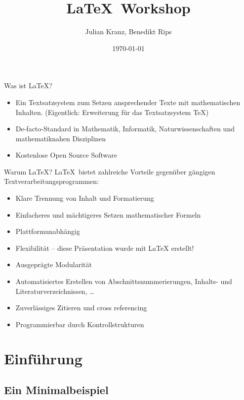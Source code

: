 \documentclass[german]{f1rstlady/templates/presentation}
\title{\LaTeX~Workshop}
\author{Julian Kranz, Benedikt Rips}
\institute[]{Learning Center}
\date{\today}
\begin{document}
\frame[plain]{\titlepage}


\AtBeginSection[]{
    \begin{frame}
        \tableofcontents[currentsection, sectionstyle=show/shaded]
    \end{frame}}

\begin{frame}{Was ist \LaTeX?}
\begin{itemize}
    \item Ein Textsatzsystem zum Setzen ansprechender Texte mit mathematischen Inhalten.
        (Eigentlich: Erweiterung für das Textsatzsystem TeX)
    \item De-facto-Standard in Mathematik, Informatik, Naturwissenschaften und mathematiknahen
        Disziplinen
    \item Kostenlose Open Source Software
\end{itemize}
\end{frame}

\begin{frame}{Warum \LaTeX?}
\LaTeX~bietet zahlreiche Vorteile gegenüber gängigen Textverarbeitungsprogrammen:
\begin{itemize}
    \item Klare Trennung von Inhalt und Formatierung
    \item Einfacheres und mächtigeres Setzen mathematischer Formeln
    \item Plattformunabhängig
    \item Flexibilität – diese Präsentation wurde mit LaTeX erstellt!
    \item Ausgeprägte Modularität
    \item Automatisiertes Erstellen von Abschnittsnummerierungen, Inhalts- und
        Literaturverzeichnissen, \dots
    \item Zuverlässiges Zitieren und cross referencing
    \item Programmierbar durch Kontrollstrukturen
\end{itemize}
\end{frame}

\section{Einführung}

\subsection{Ein Minimalbeispiel}
\end{document}
